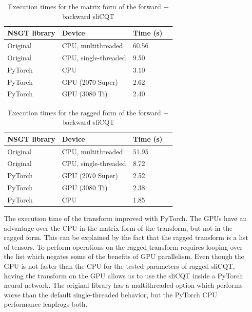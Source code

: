 \documentclass[report.tex]{subfiles}
\begin{document}
\begin{table}[ht]
	\centering
	\caption{Execution times for the matrix form of the forward + backward sliCQT}
	\label{table:nsgttorchresultsmatrix}
	\begin{tabular}{ |l|l|l|l| }
	 \hline
		NSGT library & Device & Time (s) \\
	 \hline
	 \hline
		Original & CPU, multithreaded & 60.56  \\
	 \hline
		Original & CPU, single-threaded & 9.50  \\
	 \hline
		PyTorch & CPU & 3.10  \\
	 \hline
		PyTorch & GPU (2070 Super) & 2.62 \\
	 \hline
		PyTorch & GPU (3080 Ti) &  2.40 \\
	 \hline
\end{tabular}
\end{table}

\begin{table}[ht]
	\centering
	\caption{Execution times for the ragged form of the forward + backward sliCQT}
	\label{table:nsgttorchresultsragged}
	\begin{tabular}{ |l|l|l|l| }
	 \hline
		NSGT library & Device & Time (s) \\
	 \hline
	 \hline
		Original & CPU, multithreaded & 51.95  \\
	 \hline
		Original & CPU, single-threaded & 8.72  \\
	 \hline
		PyTorch & GPU (2070 Super) & 2.52 \\
	 \hline
		PyTorch & GPU (3080 Ti) &  2.38 \\
	 \hline
		PyTorch & CPU & 1.85  \\
	 \hline
\end{tabular}
\end{table}

The execution time of the transform improved with PyTorch. The GPUs have an advantage over the CPU in the matrix form of the transform, but not in the ragged form. This can be explained by the fact that the ragged transform is a list of tensors. To perform operations on the ragged transform requires looping over the list which negates some of the benefits of GPU parallelism. Even though the GPU is not faster than the CPU for the tested parameters of ragged sliCQT, having the transform on the GPU allows us to use the sliCQT inside a PyTorch neural network. The original library has a multithreaded option which performs worse than the default single-threaded behavior, but the PyTorch CPU performance leapfrogs both.
\end{document}
